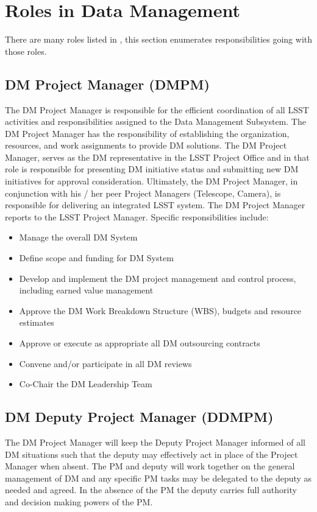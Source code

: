 \section{Roles in Data Management}

There are many roles listed in , this section enumerates responsibilities going with those roles. 


\subsection{DM Project Manager (DMPM)\label{role:dmpm}}

The DM Project Manager is responsible for the efficient coordination of all LSST activities and responsibilities assigned to the Data Management Subsystem. The DM Project Manager has the responsibility of establishing the organization, resources, and work assignments to provide DM solutions.  The DM Project Manager, serves as the DM representative in the LSST Project Office and in that role is responsible for presenting DM initiative status and submitting new DM initiatives for approval consideration. Ultimately, the DM Project Manager, in conjunction with his / her peer Project Managers (Telescope, Camera), is responsible for delivering an integrated LSST system. The DM Project Manager reports to the LSST Project Manager. Specific responsibilities include:

\begin{itemize}
\item Manage the overall DM System
\item Define scope and funding for DM System 
\item Develop and implement the DM project management and control process, including earned value management
\item Approve the DM Work Breakdown Structure (WBS), budgets and resource estimates
\item Approve or execute as appropriate all DM outsourcing contracts 
\item Convene and/or participate in all DM reviews
\item Co-Chair the DM Leadership Team
\end{itemize}

\subsection{DM Deputy Project Manager (DDMPM) \label{role:dmdpm}}
The DM Project Manager will keep the Deputy Project Manager informed of all DM situations such that the deputy may effectively act in place of the Project Manager when absent. 
The PM and deputy will work together on the general management of DM and any specific PM tasks may be delegated to the deputy as needed and agreed. In the absence of the PM the deputy carries full authority and decision making powers of the PM. 

